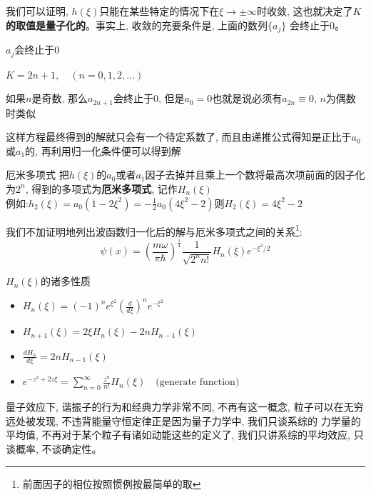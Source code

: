 \documentclass[a4paper,zihao=-4,linespread=1]{ctexrep}
\newenvironment{lequation}{\large\begin{equation}}{\end{equation}}
\begin{document}
    我们可以证明, $h(\xi)$只能在某些特定的情况下在$\xi \to \pm \infty$时收敛, 这也就决定了\textbf{$K$的取值是量子化的}。事实上, 收敛的充要条件是, 上面的数列$\{a_j\}$
    会终止于$0$。
    \begin{proposition}{$a_j$会终止于$0$}
        \begin{center}
            \begin{math}
            \displaystyle
            K=2n+1,\quad (n=0,1,2,\ldots)
            \end{math}
        \end{center}
        如果$n$是奇数, 那么$a_{2n+1}$会终止于$0$, 但是$a_0=0$也就是说必须有$a_{2n}\equiv 0$, $n$为偶数时类似
    \end{proposition}
    这样方程最终得到的解就只会有一个待定系数了, 而且由递推公式得知是正比于$a_0$或$a_1$的, 再利用归一化条件便可以得到解
    \begin{define}{厄米多项式}
        把$h(\xi)$的$a_0$或者$a_1$因子去掉并且乘上一个数将最高次项前面的因子化为$2^n$, 得到的多项式为\textbf{厄米多项式}, 记作$H_n(\xi)$\\
        例如:$h_2(\xi)=a_0(1-2\xi^2)=-\frac{1}{2}a_0(4\xi^2-2)$则$H_2(\xi)=4\xi^2-2$
    \end{define}
    我们不加证明地列出波函数归一化后的解与厄米多项式之间的关系\footnote{前面因子的相位按照惯例按最简单的取}:
    \begin{lequation}
        \boxed{
            \psi(x)=\left(\frac{m\omega}{\pi\hbar}\right)^{\frac{1}{4}}\frac{1}{\sqrt{2^nn!}}H_n(\xi)e^{-\xi^2/2}
        }
    \end{lequation}
    \begin{theorem}{$H_n(\xi)$的诸多性质}
        \begin{itemize}
            \item 
                \begin{math}
                    \displaystyle
                    H_n(\xi)=(-1)^ne^{\xi^2}\left(\frac{d}{d\xi}\right)^ne^{-\xi^2}
                \end{math}
            \item 
                \begin{math}
                    \displaystyle
                    H_{n+1}(\xi)=2\xi H_n(\xi)-2nH_{n-1}(\xi)
                \end{math}
            \item 
                \begin{math}
                    \displaystyle
                    \frac{d H_n}{d\xi}=2n H_{n-1}(\xi)
                \end{math}
            \item 
                \begin{math}
                    \displaystyle
                    e^{-z^2+2z\xi}=\sum_{n=0}^{\infty}\frac{z^n}{n!}H_n(\xi)\quad\text{(generate function)}
                \end{math}
        \end{itemize}
    \end{theorem}
    量子效应下, 谐振子的行为和经典力学非常不同, 不再有这一概念, 粒子可以在无穷远处被发现, 不违背能量守恒定律正是因为量子力学中, 我们只谈系综的
    力学量的平均值, 不再对于某个粒子有诸如动能这些的定义了, 我们只讲系综的平均效应, 只谈概率, 不谈确定性。
\end{document}
